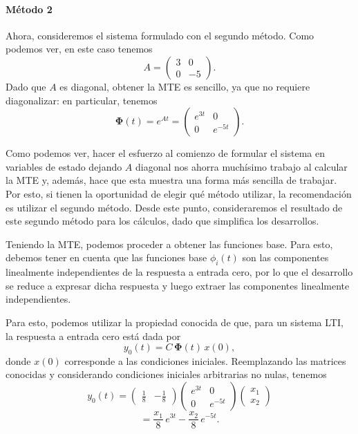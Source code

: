 \documentclass[
  11pt,
  letterpaper,
   addpoints,
   answers
  ]{exam}
\begin{document}
\begin{questions}
\begin{solution}
\paragraph{Método 2}
Ahora, consideremos el sistema formulado con el segundo método. Como podemos ver,
en este caso tenemos
\begin{equation}
A=\begin{pmatrix}
3 & 0\\
0 & -5
\end{pmatrix}.
\end{equation}
Dado que $A$ es diagonal, obtener la MTE es sencillo, ya que no requiere diagonalizar: en particular,
tenemos
\begin{equation}
\boldsymbol{\Phi}(t)=e^{At}=
\begin{pmatrix}
e^{3t} & 0\\
0 & e^{-5t}
\end{pmatrix}.
\end{equation}

Como podemos ver, hacer el esfuerzo al comienzo de formular el sistema en variables de estado dejando
$A$ diagonal nos ahorra muchísimo trabajo al calcular la MTE y, además, hace que esta
muestra una forma más sencilla de trabajar. Por esto, si tienen la oportunidad de elegir qué
método utilizar, la recomendación es utilizar el segundo método. Desde este punto, consideraremos
el resultado de este segundo método para los cálculos, dado que simplifica los desarrollos.

Teniendo la MTE, podemos proceder a obtener las funciones base. Para esto, debemos tener en
cuenta que las funciones base $\phi_i(t)$ son las componentes linealmente independientes de la
respuesta a entrada cero, por lo que el desarrollo se reduce a expresar dicha respuesta y
luego extraer las componentes linealmente independientes.

Para esto, podemos utilizar la propiedad conocida de que, para un sistema LTI, la respuesta a
entrada cero está dada por
\begin{equation}
y_0(t)=C\,\boldsymbol{\Phi}(t)\,x(0),
\end{equation}
donde $x(0)$ corresponde a las condiciones iniciales. Reemplazando las matrices conocidas y considerando
condiciones iniciales arbitrarias no nulas, tenemos
\begin{equation}
y_0(t)=\begin{pmatrix}\frac{1}{8} & -\frac{1}{8}\end{pmatrix}
\begin{pmatrix}
e^{3t} & 0\\
0 & e^{-5t}
\end{pmatrix}
\begin{pmatrix}
x_1\\ x_2
\end{pmatrix}
\end{equation}
\begin{equation}
=\frac{x_1}{8}\,e^{3t}-\frac{x_2}{8}\,e^{-5t}.
\end{equation}


\end{solution}
\end{questions}
\end{document}
